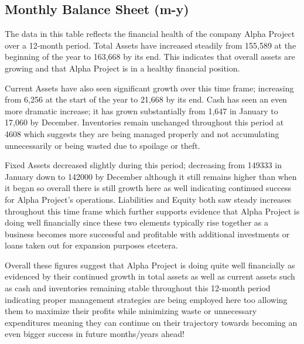 

\subsection{Monthly Balance Sheet (m-y)}\label{sec:title}


The data in this table reflects the financial health of the company Alpha Project over a 12-month period. Total Assets have increased steadily from 155,589 at the beginning of the year to 163,668 by its end. This indicates that overall assets are growing and that Alpha Project is in a healthy financial position. 

Current Assets have also seen significant growth over this time frame; increasing from 6,256 at the start of the year to 21,668 by its end. Cash has seen an even more dramatic increase; it has grown substantially from 1,647 in January to 17,060 by December. Inventories remain unchanged throughout this period at 4608 which suggests they are being managed properly and not accumulating unnecessarily or being wasted due to spoilage or theft. 

Fixed Assets decreased slightly during this period; decreasing from 149333 in January down to 142000 by December although it still remains higher than when it began so overall there is still growth here as well indicating continued success for Alpha Project's operations. Liabilities and Equity both saw steady increases throughout this time frame which further supports evidence that Alpha Project is doing well financially since these two elements typically rise together as a business becomes more successful and profitable with additional investments or loans taken out for expansion purposes etcetera. 

Overall these figures suggest that Alpha Project is doing quite well financially as evidenced by their continued growth in total assets as well as current assets such as cash and inventories remaining stable throughout this 12-month period indicating proper management strategies are being employed here too allowing them to maximize their profits while minimizing waste or unnecessary expenditures meaning they can continue on their trajectory towards becoming an even bigger success in future months/years ahead!